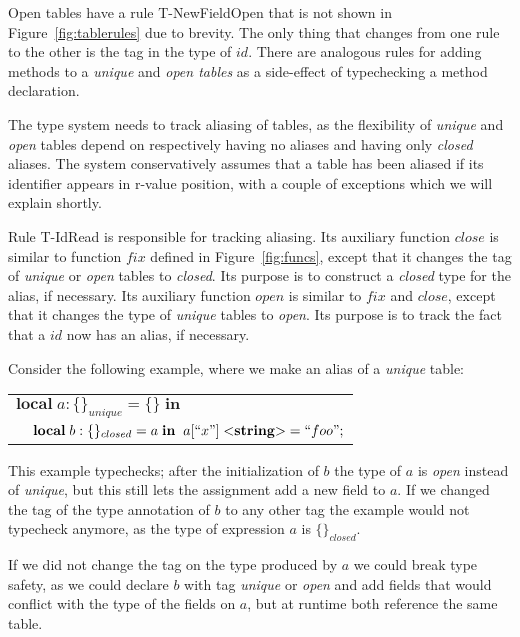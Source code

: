 \documentclass[10pt]{sigplanconf}
\newcommand{\String}{\mathbf{string}}
\begin{document}
Open tables have a rule {\sc T-NewFieldOpen} that is not shown
in Figure~\ref{fig:tablerules} due to brevity. The only thing that
changes from one rule to the other is the tag in the type of $id$.
There are analogous rules for adding methods to a {\em unique}
and {\em open tables} as a side-effect of typechecking a method declaration.

The type system needs to track aliasing of tables,
as the flexibility of {\em unique} and {\em open} tables
depend on respectively having no aliases and having only {\em closed} aliases. The system conservatively assumes that
a table has been aliased if its identifier appears in r-value position, with a couple of exceptions which we will explain shortly.

Rule {\sc T-IdRead} is responsible for tracking
aliasing. Its auxiliary function $close$ is similar to
function $fix$ defined in Figure~\ref{fig:funcs},
except that it changes the tag of {\em unique} or
{\em open} tables to {\em closed}. Its purpose
is to construct a {\em closed} type for the alias,
if necessary. Its auxiliary function $open$ is similar
to $fix$ and $close$, except that it changes the type of
{\em unique} tables to {\em open}. Its purpose
is to track the fact that a $id$ now has an alias,
if necessary.
 
Consider the following example, where we make an alias
of a {\em unique} table:
{\footnotesize
\begin{center}
\begin{tabular}{lll}
\multicolumn{3}{l}{$\mathbf{local} \; a:\{\}_{unique} = \{\} \; \mathbf{in}$}\\
& \multicolumn{2}{l}{$\mathbf{local} \; b:\{\}_{closed} = a \; \mathbf{in}\;\;a[``x"] \; {<}\String{>} = ``foo";$}
\end{tabular}
\end{center}
}

This example typechecks; after the initialization of $b$
the type of $a$ is {\em open} instead of {\em unique}, but
this still lets the assignment add a new field to $a$.
If we changed the tag of the type annotation of $b$ to
any other tag the example would not typecheck anymore,
as the type of expression $a$ is $\{\}_{closed}$.

If we did not change the tag on the type produced by $a$
we could break type safety, as we could declare $b$ with
tag {\em unique} or {\em open} and add fields that would
conflict with the type of the fields on $a$, but at
runtime both reference the same table. 
\end{document}
